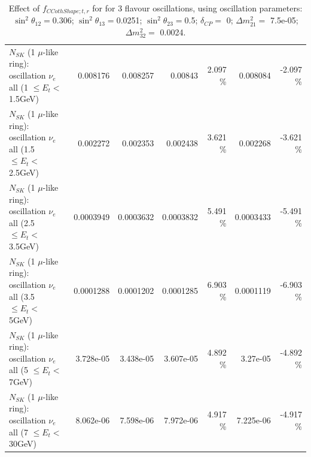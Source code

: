 \begin{table}
\begin{tabular}{| l | r | r | r  r | r  r |}
$N_{SK}$ (1 $\mu$-like ring): oscillation $\nu_{e}$ all (1 $\leq E_{t} <$ 1.5GeV) &        0.008176 &        0.008257 &         0.00843 &    2.097 \%  &        0.008084 &   -2.097 \%  \\ 
$N_{SK}$ (1 $\mu$-like ring): oscillation $\nu_{e}$ all (1.5 $\leq E_{t} <$ 2.5GeV) &        0.002272 &        0.002353 &        0.002438 &    3.621 \%  &        0.002268 &   -3.621 \%  \\ 
$N_{SK}$ (1 $\mu$-like ring): oscillation $\nu_{e}$ all (2.5 $\leq E_{t} <$ 3.5GeV) &       0.0003949 &       0.0003632 &       0.0003832 &    5.491 \%  &       0.0003433 &   -5.491 \%  \\ 
$N_{SK}$ (1 $\mu$-like ring): oscillation $\nu_{e}$ all (3.5 $\leq E_{t} <$ 5GeV) &       0.0001288 &       0.0001202 &       0.0001285 &    6.903 \%  &       0.0001119 &   -6.903 \%  \\ 
 $N_{SK}$ (1 $\mu$-like ring): oscillation $\nu_{e}$ all (5 $\leq E_{t} <$ 7GeV) &       3.728e-05 &       3.438e-05 &       3.607e-05 &    4.892 \%  &        3.27e-05 &   -4.892 \%  \\ 
$N_{SK}$ (1 $\mu$-like ring): oscillation $\nu_{e}$ all (7 $\leq E_{t} <$ 30GeV) &       8.062e-06 &       7.598e-06 &       7.972e-06 &    4.917 \%  &       7.225e-06 &   -4.917 \%  \\ 
\hline
\hline
\end{tabular}
\caption{ Effect of $f_{CCothShape; t, r}$ for for 3 flavour oscillations, using oscillation parameters:  $\sin^2\theta_{12} = $0.306; $\sin^2\theta_{13} = $0.0251; $\sin^2\theta_{23} = $0.5; $\delta_{CP} = $        0; $\Delta m^2_{21} = $    7.5e-05; $\Delta m^2_{32} = $    0.0024. }
\label{tab:num_xsec_shape_ccoth_1RmuT_3f_osc_t13:0.0251}
\end{table}
\clearpage
